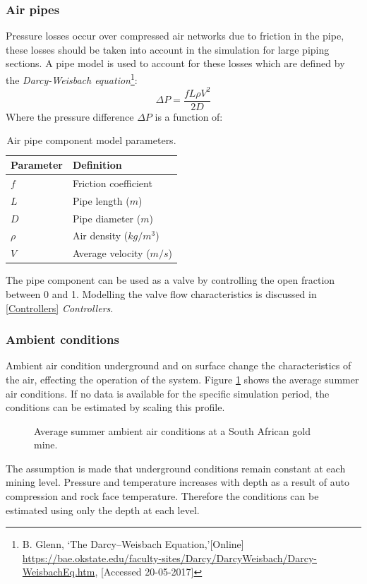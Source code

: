 		\subsubsection{Air pipes}
		Pressure losses occur over compressed air networks due to friction in the pipe, these losses should be taken into account in the simulation for large piping sections. A pipe model is used to account for these losses which are defined by the \textit{Darcy-Weisbach equation}\footnote{ B. Glenn, \enquote*{The Darcy–Weisbach Equation,}[Online] \url{https://bae.okstate.edu/faculty-sites/Darcy/DarcyWeisbach/Darcy-WeisbachEq.htm}, [Accessed 20-05-2017]}:
		$$\Delta P = \frac{f  L \rho V^2}{2 D}$$
		Where the pressure difference $\Delta P $ is a function of:\\
		\begin{table}[h]
			\centering
			\begin{tabular}{ll}
				\hline
				Parameter & Definition\\
				\hline
				$f$ & Friction coefficient  \\
				$L$ & Pipe length ($m$) \\
				$D$ & Pipe diameter ($m$) \\
				$\rho$ & Air density ($kg/m^3$)\\	
				$V$ & Average velocity ($m/s$) \\	
				\hline
			\end{tabular} 
		\caption{Air pipe component model parameters.}
		\label{table: Darcy-Weisbach}
		\end{table}
		
		The pipe component can be used as a valve by controlling the open fraction between 0 and 1. Modelling the valve flow characteristics is discussed in \ref{Controllers} \textit{Controllers}.
		\subsubsection{Ambient conditions}
		Ambient air condition underground and on surface change the characteristics of the air, effecting the operation of the system. Figure \ref{fig: Ambient} shows the average summer air conditions. If no data is available for the specific simulation period, the conditions can be estimated by scaling this profile. 
		\begin{figure}[h]
			\centering
			\fbox{}
			\caption{Average summer ambient air conditions at a South African gold mine.}
			\label{fig: Ambient}
		\end{figure}
		The assumption is made that underground conditions remain constant at each mining level. Pressure and temperature increases with depth as a result of auto compression and rock face temperature. Therefore the conditions can be estimated using only the depth at each level.   
